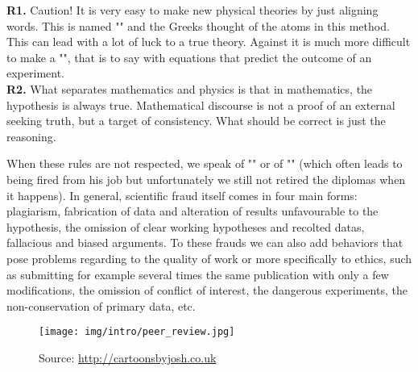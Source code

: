 	\begin{tcolorbox}[title=Remarks,colframe=black,arc=10pt]
\textbf{R1.} Caution! It is very easy to make new physical theories by just aligning words. This is named "" and the Greeks thought of the atoms in this method. This can lead with a lot of luck to a true theory. Against it is much more difficult to make a "", that is to say with equations that predict the outcome of an experiment.\\

\textbf{R2.} What separates mathematics and physics is that in mathematics, the hypothesis is always true. Mathematical discourse is not a proof of an external seeking truth, but a target of consistency. What should be correct is just the reasoning. 
	\end{tcolorbox}

When these rules are not respected, we speak of "" or of "" (which often leads to being fired from his job but unfortunately we still not retired the diplomas when it happens). In general, scientific fraud itself comes in four main forms: plagiarism, fabrication of data and alteration of results unfavourable to the hypothesis, the omission of clear working hypotheses and recolted datas, fallacious and biased arguments. To these frauds we can also add behaviors that pose problems regarding to the quality of work or more specifically to ethics, such as  submitting for example several times the same publication with only a few modifications, the omission of conflict of interest, the dangerous experiments, the non-conservation of primary data, etc.
	\begin{figure}[H]
		\centering
		\texttt{[image: img/intro/peer\_review.jpg]}
		\caption[]{Source: \url{http://cartoonsbyjosh.co.uk}}
	\end{figure}	

